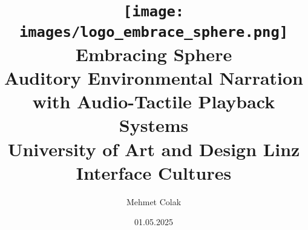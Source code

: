 \begin{titlepage}
  
    \author{Mehmet Colak}
    \title{\texttt{[image: images/logo\_embrace\_sphere.png]}\\[5ex]  Embracing Sphere\\[1ex] 
    \Large Auditory Environmental Narration with Audio-Tactile Playback Systems\\[4ex]
    \large University of Art and Design Linz\\[0.5ex]
    Interface Cultures\\[6ex]}
    \date{01.05.2025}

\end{titlepage}

\maketitle